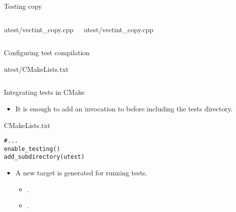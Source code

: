 \begin{frame}[t,fragile]{Testing copy}
\begin{columns}[T]

\begin{block}{utest/vectint\_copy.cpp}

\end{block}

\begin{block}{utest/vectint\_copy.cpp}

\end{block}
\end{columns}
\end{frame}

\begin{frame}[t]{Configuring test compilation}
\begin{block}{utest/CMakeLists.txt}\tiny
\inputminted{cmake}{examples/vector2/utest/CMakeLists.txt}
\end{block}
\end{frame}

\begin{frame}[t,fragile]{Integrating tests in CMake}
\begin{itemize}
  \item It is enough to add an invocation to  
        before including the tests directory.
\end{itemize}

\vfill
\begin{block}{CMakeLists.txt}\small
\begin{verbatim}
#...
enable_testing()
add_subdirectory(utest)
\end{verbatim}
\end{block}

\vfill
\begin{itemize}
  \item A new target is generated for running tests.
    \begin{itemize}
      \item {}.
      \item {}.
    \end{itemize}
\end{itemize}
\end{frame}

